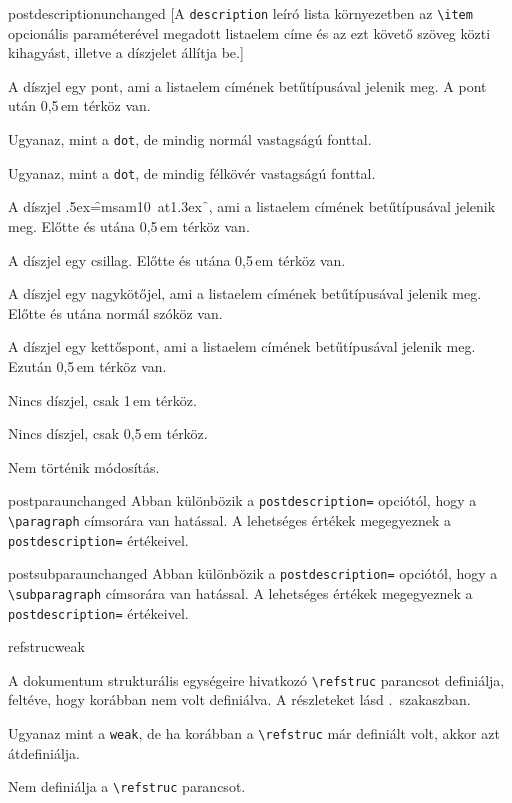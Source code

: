 \documentclass[12pt]{article}
\begin{document}
\begin{description}
\begin{hunopt}{postdescription}{unchanged}
[A \texttt{description} leíró lista környezetben az \texttt{\textbackslash item} opcionális paraméterével megadott listaelem címe és az ezt követő szöveg közti kihagyást, illetve a díszjelet állítja be.]
\item[dot]
A díszjel egy pont, ami a listaelem címének betűtípusával jelenik meg.
A pont után 0,5\,em térköz van.
\item[mddot]
Ugyanaz, mint a \texttt{dot}, de mindig normál vastagságú fonttal.
\item[bfdot]
Ugyanaz, mint a \texttt{dot}, de mindig félkövér vastagságú fonttal.
\item[diamond]
A díszjel \mbox{\raise.5ex\hbox{\font\f=msam10 at1.3ex \f{}}}, ami a listaelem címének betűtípusával jelenik meg.
Előtte és utána 0,5\,em térköz van.
\item[star]
A díszjel egy csillag.
Előtte és utána 0,5\,em térköz van.
\item[endash]
A díszjel egy nagykötőjel, ami a listaelem címének betűtípusával jelenik meg.
Előtte és utána normál szóköz van.
\item[colon]
A díszjel egy kettőspont, ami a listaelem címének betűtípusával jelenik meg.
Ezután 0,5\,em térköz van.
\item[quad]
Nincs díszjel, csak 1\,em térköz.
\item[enskip]
Nincs díszjel, csak 0,5\,em térköz.
\item[unchanged]
Nem történik módosítás.
\end{hunopt}

\begin{hunopt*}{postpara}{unchanged}
Abban különbözik a \texttt{postdescription=} opciótól, hogy a \texttt{\textbackslash paragraph} címsorára van hatással.
A lehetséges értékek megegyeznek a \texttt{postdescription=} értékeivel.
\end{hunopt*}

\begin{hunopt*}{postsubpara}{unchanged}
Abban különbözik a \texttt{postdescription=} opciótól, hogy a \texttt{\textbackslash subparagraph} címsorára van hatással.
A lehetséges értékek megegyeznek a \texttt{postdescription=} értékeivel.
\end{hunopt*}

\begin{hunopt}{refstruc}{weak}
\item[weak]
A dokumentum strukturális egységeire hivatkozó \verb|\refstruc| parancsot definiálja, feltéve, hogy korábban nem volt definiálva.
A részleteket lásd .~szakaszban.
\item[yes]
Ugyanaz mint a \texttt{weak}, de ha korábban a \verb|\refstruc| már definiált volt, akkor azt átdefiniálja.
\item[no]
Nem definiálja a \verb|\refstruc| parancsot.
\end{hunopt}


\end{description}
\end{document}
